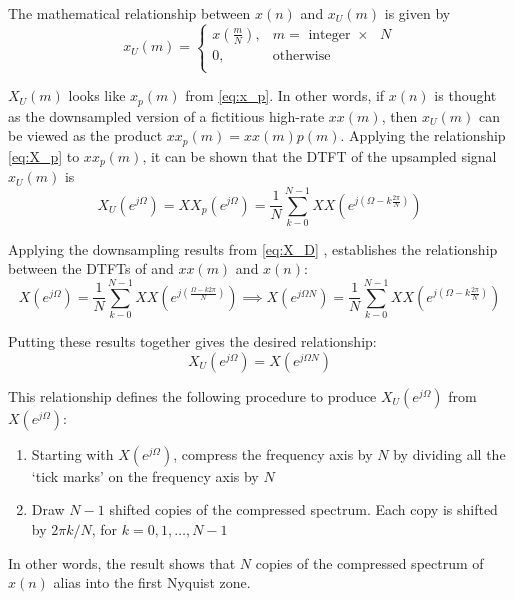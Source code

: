 The mathematical relationship between $x(n)$ and $x_U(m)$ is given by
\begin{equation}
x_U(m)=
  \begin{cases}
    x\left(\frac{m}{N}\right), & \text{$m=$ integer $\times$ $N$}\\
    0, & \text{otherwise}\\
  \end{cases}
\end{equation}

$X_U(m)$ looks like $x_p(m)$ from \eqref{eq:x_p}. In other words, if $x(n)$ is thought as the downsampled version of a fictitious high-rate $xx(m)$, then $x_U(m)$ can be viewed as the product $xx_p(m)=xx(m)p(m)$. Applying the relationship \eqref{eq:X_p} to $xx_p(m)$, it can be shown that the DTFT of the upsampled signal $x_U(m)$ is
\begin{equation}
X_U(e^{j\Omega})=XX_p(e^{j\Omega})=\frac{1}{N}\sum_{k-0}^{N-1} XX\left(e^{j\left(\Omega-k\frac{2\pi}{N}\right)}\right)
\end{equation}

Applying the downsampling results from \eqref{eq:X_D} , establishes the relationship between the DTFTs of and $xx(m)$ and $x(n)$:
\begin{equation}
X(e^{j\Omega})=\frac{1}{N}\sum_{k-0}^{N-1} XX\left(e^{j\left(\frac{\Omega-k2\pi}{N}\right)}\right)\implies X(e^{j\Omega N})=\frac{1}{N}\sum_{k-0}^{N-1} XX\left(e^{j\left(\Omega-k\frac{2\pi}{N}\right)}\right)
\end{equation}

Putting these results together gives the desired relationship:
\begin{equation}
X_U(e^{j\Omega})=X(e^{j\Omega N})
\end{equation}

This relationship defines the following procedure to produce $X_U(e^{j\Omega})$ from $X(e^{j\Omega})$:
\begin{enumerate}
  \item Starting with $X(e^{j\Omega})$, compress the frequency axis by $N$ by dividing all the `tick marks' on the frequency axis by $N$
  \item Draw $N-1$ shifted copies of the compressed spectrum. Each copy is shifted by $2\pi k/N$, for $k=0,1,\ldots,N-1$
\end{enumerate}

In other words, the result shows that $N$ copies of the compressed spectrum of $x(n)$ alias into the first Nyquist zone.

